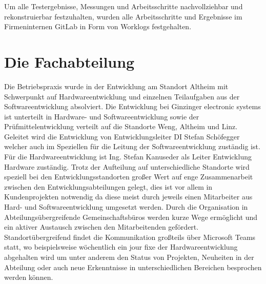 \documentclass[praktikum,german]{hgbthesis}
\begin{document}
Um alle Testergebnisse, Messungen und Arbeitsschritte nachvollziehbar und rekonstruierbar festzuhalten, wurden alle Arbeitsschritte und Ergebnisse im Firmeninternen GitLab in Form von Worklogs festgehalten.

\mainmatter           %

\chapter{Die Fachabteilung}




Die Betriebspraxis wurde in der Entwicklung am Standort Altheim mit Schwerpunkt auf Hardwareentwicklung und einzelnen Teilaufgaben aus der Softwareentwicklung absolviert. Die Entwicklung bei Ginzinger electronic systems ist unterteilt in Hardware- und Softwareentwicklung sowie der Prüfmittelentwicklung verteilt auf die Standorte Weng, Altheim und Linz. 
Geleitet wird die Entwicklung von Entwicklungsleiter DI Stefan Schöfegger welcher auch im Speziellen für die Leitung der Softwareentwicklung zuständig ist. Für die Hardwareentwicklung ist Ing. Stefan Kanuseder als Leiter Entwicklung Hardware zuständig. Trotz der Aufteilung auf unterschiedliche Standorte wird speziell bei den Entwicklungsstandorten großer Wert auf enge Zusammenarbeit zwischen den Entwicklungsabteilungen gelegt, dies ist vor allem in Kundenprojekten notwendig da diese meist durch jeweils einen Mitarbeiter aus Hard- und Softwareentwicklung umgesetzt werden. Durch die Organisation in Abteilungsübergreifende Gemeinschaftsbüros werden kurze Wege ermöglicht und ein aktiver Austausch zwischen den Mitarbeitenden gefördert. Standortübergreifend findet die Kommunikation großteils über Microsoft Teams statt, wo beispielsweise wöchentlich ein jour fixe der Hardwareentwicklung abgehalten wird um unter anderem den Status von Projekten, Neuheiten in der Abteilung oder auch neue Erkenntnisse in unterschiedlichen Bereichen besprochen werden können. 
\end{document}
